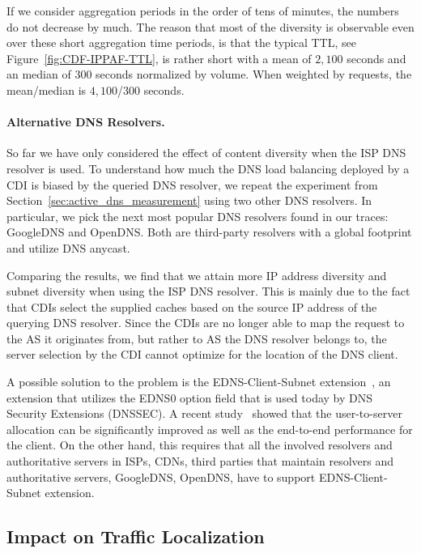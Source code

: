 If we consider aggregation periods in the order of tens of minutes, the numbers
do not decrease by much.  The reason that most of the diversity is observable
even over these short aggregation time periods, is that the typical TTL, see
Figure~\ref{fig:CDF-IPPAF-TTL}, is rather short with a mean of $2,100$ seconds
and an median of $300$ seconds normalized by volume. When weighted by requests,
the mean/median is $4,100$/$300$ seconds.

\paragraph{Alternative DNS Resolvers.}\label{sec:dns_resolvers}
So far we have only considered the effect of content diversity when the ISP DNS
resolver is used. To understand how much the DNS load balancing deployed by a
CDI is biased by the queried DNS resolver, we repeat the experiment from
Section~\ref{sec:active_dns_measurement} using two other DNS resolvers. In
particular, we pick the next most popular DNS resolvers found in our traces:
GoogleDNS and OpenDNS. Both are third-party resolvers with a global footprint
and utilize DNS anycast.

Comparing the results, we find that we attain more IP address diversity and
subnet diversity when using the ISP DNS resolver. This is mainly due to the
fact that CDIs select the supplied caches based on the source IP address of the
querying DNS resolver. Since the CDIs are no longer able to map the request to
the AS it originates from, but rather to AS the DNS resolver belongs to, the
server selection by the CDI cannot optimize for the location of the DNS client.

A possible solution to the problem is the EDNS-Client-Subnet
extension~\cite{EDNS}, an extension that utilizes the EDNS0 option field that
is used today by DNS Security Extensions (DNSSEC). A recent study~\cite{EDNS:IMC2012} showed that the
user-to-server allocation can be significantly improved as well as the
end-to-end performance for the client. On the other hand, this requires that
all the involved resolvers and authoritative servers in ISPs, CDNs, third
parties that maintain resolvers and authoritative servers, \eg GoogleDNS, OpenDNS, 
have to support EDNS-Client-Subnet extension.



\subsection{Impact on Traffic Localization}\label{sec:dns_localization}

